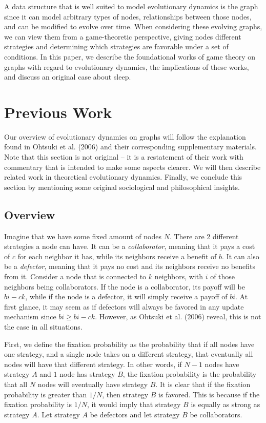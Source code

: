 \documentclass[11pt]{article}
\begin{document}
A data structure that is well suited to model evolutionary dynamics is the graph since it can model arbitrary types of nodes, relationships between those nodes, and can be modified to evolve over time. When considering these evolving graphs, we can view them from a game-theoretic perspective, giving nodes different strategies and determining which strategies are favorable under a set of conditions. In this paper, we describe the foundational works of game theory on graphs with regard to evolutionary dynamics, the implications of these works, and discuss an original case about sleep. 


\section{Previous Work}
Our overview of evolutionary dynamics on graphs will follow the explanation found in Ohtsuki et al. (2006) and their corresponding supplementary materials. Note that this section is not original -- it is a restatement of their work with commentary that is intended to make some aspects clearer. We will then describe related work in theoretical evolutionary dynamics. Finally, we conclude this section by mentioning some original sociological and philosophical insights. 

\subsection{Overview}
Imagine that we have some fixed amount of nodes $N$. There are 2 different strategies a node can have. It can be a \textit{collaborator}, meaning that it pays a cost of $c$ for each neighbor it has, while its neighbors receive a benefit of $b$. It can also be a \textit{defector}, meaning that it pays no cost and its neighbors receive no benefits from it. Consider a node that is connected to $k$ neighbors, with $i$ of those neighbors being collaborators. If the node is a collaborator, its payoff will be $bi - ck$, while if the node is a defector, it will simply receive a payoff of $bi$. At first glance, it may seem as if defectors will always be favored in any update mechanism since $bi \geq bi - ck$. However, as Ohtsuki et al. (2006) reveal, this is not the case in all situations.

First, we define the fixation probability as the probability that if all nodes have one strategy, and a single node takes on a different strategy, that eventually all nodes will have that different strategy. In other words, if $N-1$ nodes have strategy $A$ and $1$ node has strategy $B$, the fixation probability is the probability that all $N$ nodes will eventually have strategy $B$. It is clear that if the fixation probability is greater than $1 / N$, then strategy $B$ is favored. This is because if the fixation probability is $ 1/ N$, it would imply that strategy $B$ is equally as strong as strategy $A$. Let strategy $A$ be defectors and let strategy $B$ be collaborators. 
\end{document}
